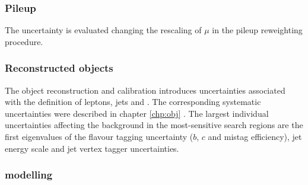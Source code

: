 \subsubsection{Pileup}
The uncertainty is evaluated changing the rescaling of $\mu$ in the pileup reweighting procedure. 

\subsubsection{Reconstructed objects}

The object reconstruction and calibration introduces uncertainties associated with the definition of leptons, jets and \MET. The corresponding systematic uncertainties were described in chapter \ref{chp:obj} . The largest individual uncertainties affecting the background in the most-sensitive search regions are the first eigenvalues of the flavour tagging uncertainty ($b$, $c$ and mistag efficiency), jet energy scale and jet vertex tagger uncertainties. 

\subsubsection[$t\bar{t}$ modelling]{ modelling}

